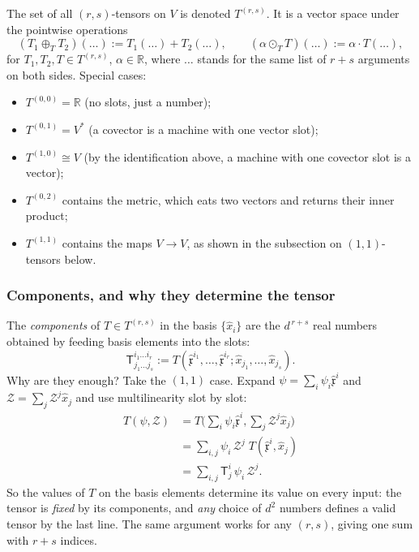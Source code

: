 \documentclass[11pt]{article}
\newcommand{\dual}{V^{*}}
\begin{document}
The set of all $(r,s)$-tensors on $V$ is denoted $T^{(r,s)}$. It is a vector space under the pointwise operations
\[
(T_1\oplus_T T_2)(\dots):=T_1(\dots)+T_2(\dots),\qquad (\alpha\odot_T T)(\dots):=\alpha\cdot T(\dots),
\]
for $T_1,T_2,T\in T^{(r,s)}$, $\alpha\in\mathbb R$, where $\dots$ stands for the same list of $r+s$ arguments on both sides. Special cases:
\begin{itemize}
  \item $T^{(0,0)}=\mathbb R$ (no slots, just a number);
  \item $T^{(0,1)}=\dual$ (a covector is a machine with one vector slot);
  \item $T^{(1,0)}\cong V$ (by the identification above, a machine with one covector slot is a vector);
  \item $T^{(0,2)}$ contains the metric, which eats two vectors and returns their inner product;
  \item $T^{(1,1)}$ contains the maps $V\to V$, as shown in the subsection on $(1,1)$-tensors below.
\end{itemize}

\subsubsection*{Components, and why they determine the tensor}
The \emph{components} of $T\in T^{(r,s)}$ in the basis $\{\hat x_i\}$ are the $d^{\,r+s}$ real numbers obtained by feeding basis elements into the slots:
\[
\mathsf T^{i_1\dots i_r}_{j_1\dots j_s}:=T(\hat{\mathfrak x}^{i_1},\dots,\hat{\mathfrak x}^{i_r};\hat x_{j_1},\dots,\hat x_{j_s}).
\]
Why are they enough? Take the $(1,1)$ case. Expand $\psi=\sum_i\psi_i\hat{\mathfrak x}^i$ and $\mathcal Z=\sum_j\mathcal Z^j\hat x_j$ and use multilinearity slot by slot:
\begin{align*}
T(\psi,\mathcal Z)&=T\Big(\sum_i\psi_i\hat{\mathfrak x}^i,\sum_j\mathcal Z^j\hat x_j\Big)\\
&=\sum_{i,j}\psi_i\,\mathcal Z^j\;T(\hat{\mathfrak x}^i,\hat x_j)\\
&=\sum_{i,j}\mathsf T^i_j\,\psi_i\,\mathcal Z^j.
\end{align*}
So the values of $T$ on the basis elements determine its value on every input: the tensor is \emph{fixed} by its components, and \emph{any} choice of $d^2$ numbers defines a valid tensor by the last line. The same argument works for any $(r,s)$, giving one sum with $r+s$ indices.
\end{document}
